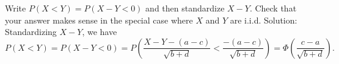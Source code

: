 

\setcounter{theorem}{24}
\begin{exercise}[BH.5.25] 
\begin{solution}
    Write $P(X<Y)=P(X-Y<0)$ and then standardize $X-Y$. Check that your answer makes sense in the special case where $X$ and $Y$ are i.i.d.
    Solution: Standardizing $X-Y$, we have
    $$
    P(X<Y)=P(X-Y<0)=P\left(\frac{X-Y-(a-c)}{\sqrt{b+d}}<\frac{-(a-c)}{\sqrt{b+d}}\right)=\Phi\left(\frac{c-a}{\sqrt{b+d}}\right) .
    $$
\end{solution}
\end{exercise}


